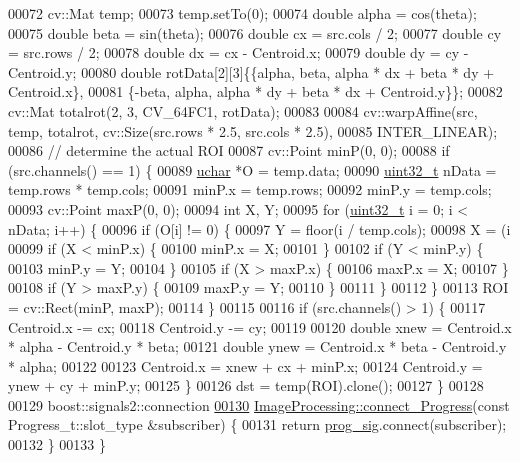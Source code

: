 \begin{DoxyCode}
00072   cv::Mat temp;
00073   temp.setTo(0);
00074   \textcolor{keywordtype}{double} alpha = cos(theta);
00075   \textcolor{keywordtype}{double} beta = sin(theta);
00076   \textcolor{keywordtype}{double} cx = src.cols / 2;
00077   \textcolor{keywordtype}{double} cy = src.rows / 2;
00078   \textcolor{keywordtype}{double} dx = cx - Centroid.x;
00079   \textcolor{keywordtype}{double} dy = cy - Centroid.y;
00080   \textcolor{keywordtype}{double} rotData[2][3]\{\{alpha, beta, alpha * dx + beta * dy + Centroid.x\},
00081                        \{-beta, alpha, alpha * dy + beta * dx + Centroid.y\}\};
00082   cv::Mat totalrot(2, 3, CV\_64FC1, rotData);
00083 
00084   cv::warpAffine(src, temp, totalrot, cv::Size(src.rows * 2.5, src.cols * 2.5),
00085                  INTER\_LINEAR);
00086   \textcolor{comment}{// determine the actual ROI}
00087   cv::Point minP(0, 0);
00088   \textcolor{keywordflow}{if} (src.channels() == 1) \{
00089     \hyperlink{_soil_math_types_8h_a65f85814a8290f9797005d3b28e7e5fc}{uchar} *O = temp.data;
00090     \hyperlink{_soil_math_types_8h_a435d1572bf3f880d55459d9805097f62}{uint32\_t} nData = temp.rows * temp.cols;
00091     minP.x = temp.rows;
00092     minP.y = temp.cols;
00093     cv::Point maxP(0, 0);
00094     \textcolor{keywordtype}{int} X, Y;
00095     \textcolor{keywordflow}{for} (\hyperlink{_soil_math_types_8h_a435d1572bf3f880d55459d9805097f62}{uint32\_t} i = 0; i < nData; i++) \{
00096       \textcolor{keywordflow}{if} (O[i] != 0) \{
00097         Y = floor(i / temp.cols);
00098         X = (i %
00099         \textcolor{keywordflow}{if} (X < minP.x) \{
00100           minP.x = X;
00101         \}
00102         \textcolor{keywordflow}{if} (Y < minP.y) \{
00103           minP.y = Y;
00104         \}
00105         \textcolor{keywordflow}{if} (X > maxP.x) \{
00106           maxP.x = X;
00107         \}
00108         \textcolor{keywordflow}{if} (Y > maxP.y) \{
00109           maxP.y = Y;
00110         \}
00111       \}
00112     \}
00113     ROI = cv::Rect(minP, maxP);
00114   \}
00115 
00116   \textcolor{keywordflow}{if} (src.channels() > 1) \{
00117     Centroid.x -= cx;
00118     Centroid.y -= cy;
00119 
00120     \textcolor{keywordtype}{double} xnew = Centroid.x * alpha - Centroid.y * beta;
00121     \textcolor{keywordtype}{double} ynew = Centroid.x * beta - Centroid.y * alpha;
00122 
00123     Centroid.x = xnew + cx + minP.x;
00124     Centroid.y = ynew + cy + minP.y;
00125   \}
00126   dst = temp(ROI).clone();
00127 \}
00128 
00129 boost::signals2::connection
\hypertarget{_image_processing_8cpp_source_l00130}{}\hyperlink{class_vision_1_1_image_processing_a013b9623c6a2933ec5f78b13a450994d}{00130} \hyperlink{class_vision_1_1_image_processing_a013b9623c6a2933ec5f78b13a450994d}{ImageProcessing::connect\_Progress}(\textcolor{keyword}{const} Progress\_t::slot\_type &subscriber)
       \{
00131   \textcolor{keywordflow}{return} \hyperlink{class_vision_1_1_image_processing_ac0c168e16365ff5941791f67ec895663}{prog\_sig}.connect(subscriber);
00132 \}
00133 \}
\end{DoxyCode}
